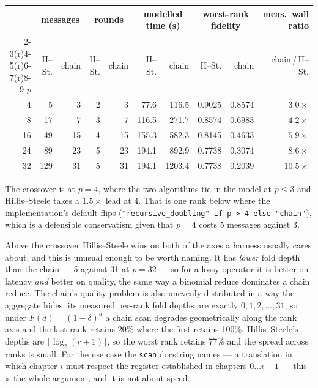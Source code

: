 \documentclass[11pt]{article}
\begin{document}
\begin{center}\footnotesize
\begin{tabular}{@{}rrrrrrrrrr@{}}
\toprule
  & \multicolumn{2}{c}{messages} & \multicolumn{2}{c}{rounds} & \multicolumn{2}{c}{modelled time (s)} & \multicolumn{2}{c}{worst-rank fidelity} & meas.\ wall ratio \\
  \cmidrule(r){2-3}\cmidrule(r){4-5}\cmidrule(r){6-7}\cmidrule(r){8-9}
  $p$ & H--St. & chain & H--St. & chain & H--St. & chain & H--St. & chain & chain\,/\,H--St. \\
\midrule
  4  & 5   & 3  & 2 & 3  & 77.6  & 116.5  & 0.9025 & 0.8574 & $3.0\times$  \\
  8  & 17  & 7  & 3 & 7  & 116.5 & 271.7  & 0.8574 & 0.6983 & $4.2\times$  \\
  16 & 49  & 15 & 4 & 15 & 155.3 & 582.3  & 0.8145 & 0.4633 & $5.9\times$  \\
  24 & 89  & 23 & 5 & 23 & 194.1 & 892.9  & 0.7738 & 0.3074 & $8.6\times$  \\
  32 & 129 & 31 & 5 & 31 & 194.1 & 1203.4 & 0.7738 & 0.2039 & $10.5\times$ \\
\bottomrule
\end{tabular}\normalsize
\end{center}

\noindent
The crossover is at $p=4$, where the two algorithms tie in the model at $p \le 3$ and
Hillis--Steele takes a $1.5\times$ lead at 4. That is one rank below where the implementation's
default flips (\texttt{"recursive\_doubling" if p > 4 else "chain"}), which is a defensible
conservatism given that $p=4$ costs 5 messages against 3.

Above the crossover Hillis--Steele wins on both of the axes a harness usually cares about, and this
is unusual enough to be worth naming. It has \emph{lower} fold depth than the chain --- 5 against
31 at $p=32$ --- so for a lossy operator it is better on latency \emph{and} better on quality, the
same way a binomial reduce dominates a chain reduce. The chain's quality problem is also unevenly
distributed in a way the aggregate hides: its measured per-rank fold depths are exactly
$0, 1, 2, \ldots, 31$, so under $F(d) = (1-\delta)^d$ a chain scan degrades geometrically along the
rank axis and the last rank retains 20\% where the first retains 100\%. Hillis--Steele's depths are
$\lceil\log_2(r+1)\rceil$, so the worst rank retains 77\% and the spread across ranks is small.
For the use case the \texttt{scan} docstring names --- a translation in which chapter $i$ must
respect the register established in chapters $0 \ldots i-1$ --- this is the whole argument, and it
is not about speed.
\end{document}
